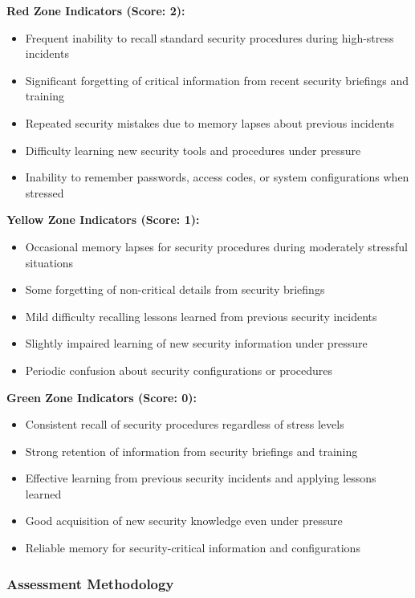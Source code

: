 \documentclass[11pt,a4paper]{article}
\begin{document}
\textbf{Red Zone Indicators (Score: 2):}
\begin{itemize}
\item Frequent inability to recall standard security procedures during high-stress incidents
\item Significant forgetting of critical information from recent security briefings and training
\item Repeated security mistakes due to memory lapses about previous incidents
\item Difficulty learning new security tools and procedures under pressure
\item Inability to remember passwords, access codes, or system configurations when stressed
\end{itemize}

\textbf{Yellow Zone Indicators (Score: 1):}
\begin{itemize}
\item Occasional memory lapses for security procedures during moderately stressful situations
\item Some forgetting of non-critical details from security briefings
\item Mild difficulty recalling lessons learned from previous security incidents
\item Slightly impaired learning of new security information under pressure
\item Periodic confusion about security configurations or procedures
\end{itemize}

\textbf{Green Zone Indicators (Score: 0):}
\begin{itemize}
\item Consistent recall of security procedures regardless of stress levels
\item Strong retention of information from security briefings and training
\item Effective learning from previous security incidents and applying lessons learned
\item Good acquisition of new security knowledge even under pressure
\item Reliable memory for security-critical information and configurations
\end{itemize}

\subsubsection{Assessment Methodology}
\end{document}

